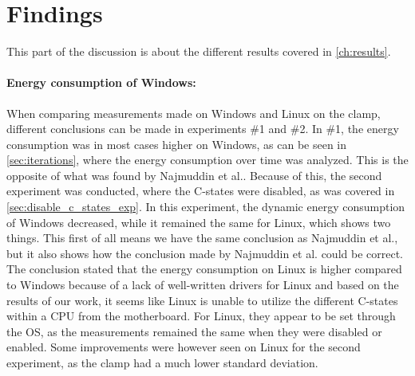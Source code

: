 \section{Findings}

This part of the discussion is about the different results covered in \cref{ch:results}.

\paragraph*{Energy consumption of Windows:} When comparing measurements made on Windows and Linux on the clamp, different conclusions can be made in experiments \#1 and \#2. In \#1, the energy consumption was in most cases higher on Windows, as can be seen in \cref{sec:iterations}, where the energy consumption over time was analyzed. This is the opposite of what was found by Najmuddin et al.\cite[]{Najmuddin2021}. Because of this, the second experiment was conducted, where the C-states were disabled, as was covered in \cref{sec:disable_c_states_exp}. In this experiment, the dynamic energy consumption of Windows decreased, while it remained the same for Linux, which shows two things. This first of all means we have the same conclusion as Najmuddin et al.\cite[]{Najmuddin2021}, but it also shows how the conclusion made by Najmuddin et al.\cite[]{Najmuddin2021} could be correct. The conclusion stated that the energy consumption on Linux is higher compared to Windows because of a lack of well-written drivers for Linux and based on the results of our work, it seems like Linux is unable to utilize the different C-states within a CPU from the motherboard. For Linux, they appear to be set through the OS, as the measurements remained the same when they were disabled or enabled. Some improvements were however seen on Linux for the second experiment, as the clamp had a much lower standard deviation.

